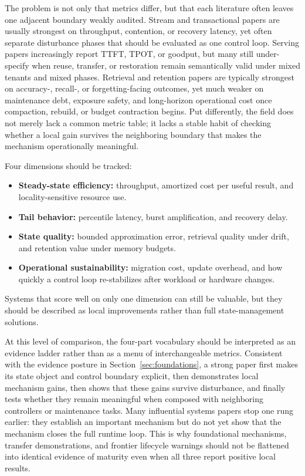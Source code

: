 \documentclass[acmsmall,screen,review]{acmart}
\begin{document}
The problem is not only that metrics differ, but that each literature often leaves one adjacent boundary weakly audited. Stream and transactional papers are usually strongest on throughput, contention, or recovery latency, yet often separate disturbance phases that should be evaluated as one control loop. Serving papers increasingly report TTFT, TPOT, or goodput, but many still under-specify when reuse, transfer, or restoration remain semantically valid under mixed tenants and mixed phases. Retrieval and retention papers are typically strongest on accuracy-, recall-, or forgetting-facing outcomes, yet much weaker on maintenance debt, exposure safety, and long-horizon operational cost once compaction, rebuild, or budget contraction begins. Put differently, the field does not merely lack a common metric table; it lacks a stable habit of checking whether a local gain survives the neighboring boundary that makes the mechanism operationally meaningful.

Four dimensions should be tracked:
\begin{itemize}[leftmargin=*]
\item \textbf{Steady-state efficiency:} throughput, amortized cost per useful result, and locality-sensitive resource use.
\item \textbf{Tail behavior:} percentile latency, burst amplification, and recovery delay.
\item \textbf{State quality:} bounded approximation error, retrieval quality under drift, and retention value under memory budgets.
\item \textbf{Operational sustainability:} migration cost, update overhead, and how quickly a control loop re-stabilizes after workload or hardware changes.
\end{itemize}
Systems that score well on only one dimension can still be valuable, but they should be described as local improvements rather than full state-management solutions.

At this level of comparison, the four-part vocabulary should be interpreted as an evidence ladder rather than as a menu of interchangeable metrics. Consistent with the evidence posture in Section~\ref{sec:foundations}, a strong paper first makes its state object and control boundary explicit, then demonstrates local mechanism gains, then shows that these gains survive disturbance, and finally tests whether they remain meaningful when composed with neighboring controllers or maintenance tasks. Many influential systems papers stop one rung earlier: they establish an important mechanism but do not yet show that the mechanism closes the full runtime loop. This is why foundational mechanisms, transfer demonstrations, and frontier lifecycle warnings should not be flattened into identical evidence of maturity even when all three report positive local results.
\end{document}

